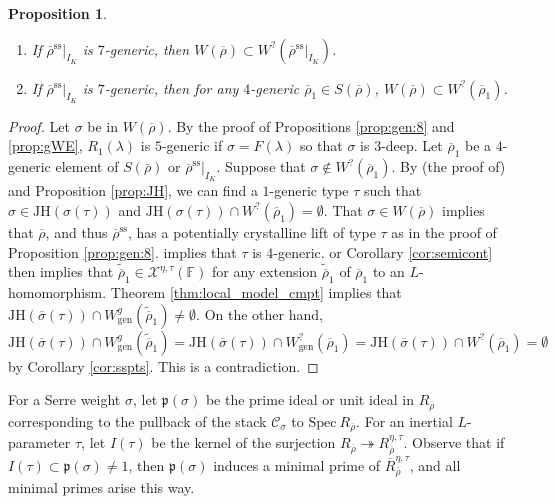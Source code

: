 \documentclass[oneside,a4paper,english, 11pt]{amsart}
\theoremstyle{plain}
\theoremstyle{plain}
\newtheorem{prop}[thm]{Proposition}
\theoremstyle{plain}
\theoremstyle{plain}
\theoremstyle{plain}
\theoremstyle{plain}
\theoremstyle{definition}
\theoremstyle{definition}
\theoremstyle{definition}
\theoremstyle{remark}
\numberwithin{equation}{section}
\newcommand{\F}{\mathbb{F}}
\newcommand{\fp}{\mathfrak{p}}
\newcommand{\cC}{\mathcal{C}}
\newcommand{\cX}{\mathcal{X}}
\newcommand{\Spec}{\mathrm{Spec}\ }
\newcommand{\semis}{\mathrm{ss}}
\newcommand{\tld}[1]{\widetilde{#1}}
\newcommand{\JH}{\mathrm{JH}}
\newcommand{\rhobar}{\overline{\rho}}
\newcommand{\ovl}[1]{\overline{#1}}
\newcommand{\surj}{\twoheadrightarrow}
\begin{document}
\begin{prop}\label{prop:WE}
\begin{enumerate}
\item If $\rhobar^{\semis}|_{I_K}$ is $7$-generic, then $W(\rhobar) \subset W^?(\rhobar^{\semis}|_{I_K})$. 
\item If $\rhobar^{\semis}|_{I_K}$ is $7$-generic, then for any $4$-generic $\rhobar_1\in S(\rhobar)$, $W(\rhobar) \subset W^?(\rhobar_1)$.
\end{enumerate}
\end{prop}
\begin{proof}
Let $\sigma$ be in $W(\rhobar)$. 
By the proof of Propositions \ref{prop:gen:8} and \ref{prop:gWE}, $R_1(\lambda)$ is $5$-generic if $\sigma = F(\lambda)$ so that $\sigma$ is $3$-deep. 
Let $\rhobar_1$ be a $4$-generic element of $S(\rhobar)$ or $\rhobar^{\semis}|_{I_K}$. 
Suppose that $\sigma\notin W^?(\rhobar_1)$. 
By (the proof of) \cite[Lemma 2.3.13]{LLLM2} and Proposition \ref{prop:JH}, we can find a $1$-generic type $\tau$ such that $\sigma\in \JH(\sigma(\tau))$ and $\JH(\sigma(\tau))\cap W^?(\rhobar_1)=\emptyset$. 
That $\sigma \in W(\rhobar)$ implies that $\rhobar$, and thus $\rhobar^{\semis}$, has a potentially crystalline lift of type $\tau$ as in the proof of Proposition \ref{prop:gen:8}. 
\cite[Proposition 3.3.2]{LLL} implies that $\tau$ is $4$-generic. 
\cite[Lemma 5]{Enns} or Corollary \ref{cor:semicont} then implies that $\tld{\rhobar}_1 \in \cX^{\eta,\tau}(\F)$ for any extension $\tld{\rhobar}_1$ of $\rhobar_1$ to an $L$-homomorphism. 
Theorem \ref{thm:local_model_cmpt} implies that $\JH(\ovl{\sigma}(\tau)) \cap W^g_{\mathrm{gen}}(\tld{\rhobar}_1) \neq \emptyset$. 
On the other hand, 
\[
\JH(\ovl{\sigma}(\tau)) \cap W^g_{\mathrm{gen}}(\tld{\rhobar}_1) = \JH(\ovl{\sigma}(\tau)) \cap W^?_{\mathrm{gen}}(\rhobar_1) = \JH(\ovl{\sigma}(\tau)) \cap W^?(\rhobar_1) = \emptyset
\]
by Corollary \ref{cor:sspts}. 
This is a contradiction.
\end{proof}

For a Serre weight $\sigma$, let $\mathfrak{p}(\sigma)$ be the prime ideal or unit ideal in $R_{\rhobar}$ corresponding to the pullback of the stack $\cC_\sigma$ to $\Spec R_{\rhobar}$. 
For an inertial $L$-parameter $\tau$, let $I(\tau)$ be the kernel of the surjection $R_{\rhobar} \surj R_{\rhobar}^{\eta,\tau}$. Observe that if $I(\tau)\subset \fp(\sigma)\neq 1$, then $\fp(\sigma)$ induces a minimal prime of $\ovl{R}^{\eta,\tau}_{\rhobar}$, and all minimal primes arise this way.
%
\end{document}
